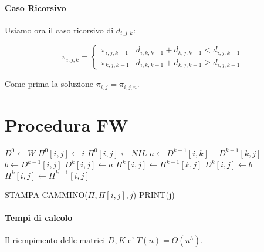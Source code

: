 \paragraph{Caso Ricorsivo}

Usiamo ora il caso ricorsivo di $d_{i,j,k}$:

\[
    \pi_{i,j,k} = 
    \begin{cases}
        \pi_{i,j,k-1} & d_{i,k,k-1} + d_{k,j,k-1} < d_{i,j,k-1} \\
        \pi_{k,j,k-1} & d_{i,k,k-1} + d_{k,j,k-1} \geq d_{i,j,k-1} 
    \end{cases}
\]

Come prima la soluzione $\pi_{i,j} = \pi_{i,j,n}$.

\section{Procedura FW}

\begin{algorithm}
    \begin{algorithmic}
        \State $D^0 \gets W$
                    \State $\Pi^0[i,j] \gets i$
                \Else
                    \State $\Pi^0[i,j] \gets NIL$
                \EndIf
            \EndFor
        \EndFor
                    \State $a \gets D^{k-1}[i,k] + D^{k-1}[k,j]$
                    \State $b \gets D^{k-1}[i,j]$
                        \State $D^k[i,j] \gets a$
                        \State $\Pi^k[i,j] \gets \Pi^{k-1}[k,j]$
                    \Else
                        \State $D^k[i,j] \gets b$
                        \State $\Pi^k[i,j] \gets \Pi^{k-1}[i,j]$
                    \EndIf
                \EndFor
            \EndFor
        \EndFor
        \EndProcedure
    \end{algorithmic}
\end{algorithm}

\begin{algorithm}
    \begin{algorithmic}
                \State STAMPA-CAMMINO($\Pi, \Pi[i,j], j$)
                \State PRINT(j)
            \EndIf
        \EndProcedure
    \end{algorithmic}
\end{algorithm}

\paragraph{Tempi di calcolo}

Il riempimento delle matrici $D, K$ e' $T(n) = \Theta(n^3)$.


